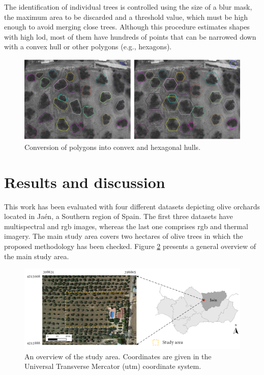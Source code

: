 The identification of individual trees is controlled using the size of a blur mask, the maximum area to be discarded and a threshold value, which must be high enough to avoid merging close trees. Although this procedure estimates shapes with high \acrshort{lod}, most of them have hundreds of points that can be narrowed down with a convex hull \cite{sklansky_finding_1982} or other polygons (e.g., hexagons). 

\begin{figure}[hbp]
    \centering
    \includegraphics[width=1\linewidth]{figs/image_fusion/convex_hull_contours.png}
    \caption{Conversion of polygons into convex and hexagonal hulls.}
    \label{fig:convex_hull_contours}
\end{figure}

\section{Results and discussion}
\label{sec:image_fusion_evaluation}

This work has been evaluated with four different datasets depicting olive orchards located in Jaén, a Southern region of Spain. The first three datasets have multispectral and \acrshort{rgb} images, whereas the last one comprises \acrshort{rgb} and thermal imagery. The main study area covers two hectares of olive trees in which the proposed methodology has been checked. Figure \ref{fig:image_fusion_study_area} presents a general overview of the main study area.

\begin{figure}[htb]
    \centering
    \includegraphics{figs/image_fusion/study_area.png}
    \caption{An overview of the study area. Coordinates are given in the Universal Transverse Mercator (\acrshort{utm}) coordinate system.}
    \label{fig:image_fusion_study_area}
\end{figure}

